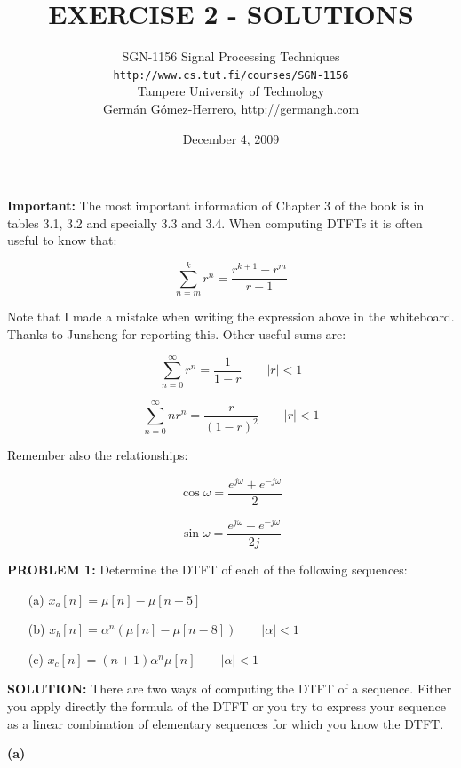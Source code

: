 \documentclass[a4paper,11pt,oneside]{article}
\title{\large{\textbf{EXERCISE 2 - SOLUTIONS}}}
\author{SGN-1156 Signal Processing Techniques\\
\texttt{http://www.cs.tut.fi/courses/SGN-1156}\\
Tampere University of Technology\\
Germ\'an G\'omez-Herrero, \url{http://germangh.com}}
\date{December 4, 2009}
\begin{document}
\maketitle


\textbf{Important:} The most important information of Chapter 3 of the book is in tables 3.1, 3.2 and specially 3.3 and 3.4. When computing DTFTs it is often useful to know that:

\[
\sum_{n=m}^{k}r^{n}=\frac{r^{k+1}-r^m}{r-1}
\]

Note that I made a mistake when writing the expression above in the whiteboard. Thanks to Junsheng for reporting this. Other useful sums are:

\[
\sum_{n=0}^{\infty} r^{n}=\frac{1}{1-r} \qquad |r|<1
\] 

\[
\sum_{n=0}^{\infty} nr^{n}=\frac{r}{(1-r)^2} \qquad |r|<1
\]

Remember also the relationships:

\[
\cos \omega = \frac{e^{j\omega}+e^{-j\omega}}{2}
\]

\[
\sin \omega = \frac{e^{j\omega}-e^{-j\omega}}{2j}
\]






\textbf{PROBLEM 1:} Determine the DTFT of each of the following sequences:

\begin{itemize}
\item[(a)] $x_a[n] = \mu[n]-\mu[n-5]$
\item[(b)] $x_b[n] = \alpha^n\left(\mu[n]-\mu[n-8]\right) \qquad |\alpha|< 1$
\item[(c)] $x_c[n] = (n+1)\alpha^n\mu[n] \qquad |\alpha|<1$
\end{itemize}  



\vspace{1cm}



\textbf{SOLUTION:}
There are two ways of computing the DTFT of a sequence. Either you apply directly the formula of the DTFT or you try to express your sequence as a linear combination of elementary sequences for which you know the DTFT. 

\vspace{.5cm}

\textbf{(a)}
\end{document}
